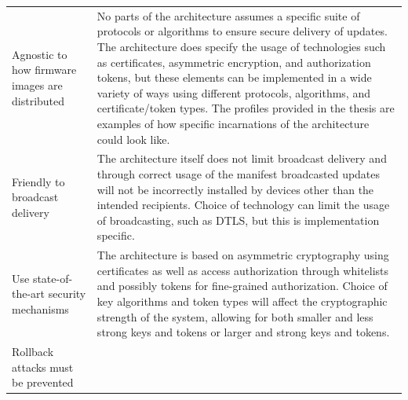 \documentclass[0-thesis.tex]{subfiles}
\begin{document}
\begin{small}
\begin{longtable}[]{@{}ll@{}}
    \begin{minipage}[t]{0.41\columnwidth}\raggedright\strut
    Agnostic to how firmware images are distributed\strut
    \end{minipage} & \begin{minipage}[t]{0.53\columnwidth}\raggedright\strut
    No parts of the architecture assumes a specific suite of protocols or
    algorithms to ensure secure delivery of updates. The architecture does
    specify the usage of technologies such as certificates, asymmetric
    encryption, and authorization tokens, but these elements can be
    implemented in a wide variety of ways using different protocols,
    algorithms, and certificate/token types. The profiles provided in the
    thesis are examples of how specific incarnations of the architecture
    could look like.\strut
    \end{minipage}\tabularnewline
    \begin{minipage}[t]{0.41\columnwidth}\raggedright\strut
    Friendly to broadcast delivery\strut
    \end{minipage} & \begin{minipage}[t]{0.53\columnwidth}\raggedright\strut
    The architecture itself does not limit broadcast delivery and through
    correct usage of the manifest broadcasted updates will not be
    incorrectly installed by devices other than the intended recipients.
    Choice of technology can limit the usage of broadcasting, such as DTLS,
    but this is implementation specific.\strut
    \end{minipage}\tabularnewline
    \begin{minipage}[t]{0.41\columnwidth}\raggedright\strut
    Use state-of-the-art security mechanisms\strut
    \end{minipage} & \begin{minipage}[t]{0.53\columnwidth}\raggedright\strut
    The architecture is based on asymmetric cryptography using certificates
    as well as access authorization through whitelists and possibly tokens
    for fine-grained authorization. Choice of key algorithms and token types
    will affect the cryptographic strength of the system, allowing for both
    smaller and less strong keys and tokens or larger and strong keys and
    tokens.\strut
    \end{minipage}\tabularnewline
    \begin{minipage}[t]{0.41\columnwidth}\raggedright\strut
    Rollback attacks must be prevented\strut
    \end{minipage} & \begin{minipage}[t]{0.53\columnwidth}\raggedright\strut

\end{minipage}
\end{longtable}
\end{small}
\end{document}
